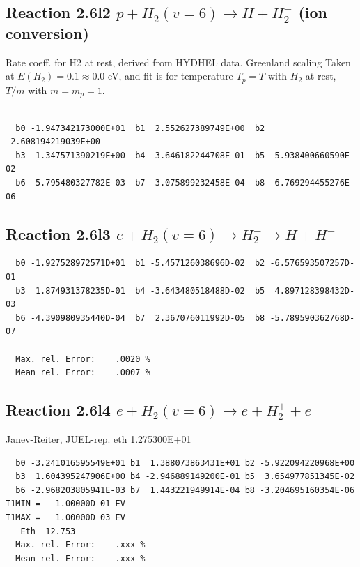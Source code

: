 \documentclass[12pt,dvipdfmx]{article}
\begin{document}
\subsection{
Reaction 2.6l2
$ p + H_2(v=6) \rightarrow H + H_2^+$ (ion conversion)
}
Rate coeff. for H2 at rest, derived from HYDHEL data. Greenland scaling
Taken at $E(H_2) = 0.1 \approx 0.0$ eV,  and fit is for temperature $T_p=T$ with $H_2$ at rest,
$T/m$ with $m=m_p=1$.

\begin{small}\begin{verbatim}

  b0 -1.947342173000E+01  b1  2.552627389749E+00  b2 -2.608194219039E+00
  b3  1.347571390219E+00  b4 -3.646182244708E-01  b5  5.938400660590E-02
  b6 -5.795480327782E-03  b7  3.075899232458E-04  b8 -6.769294455276E-06

\end{verbatim}\end{small}

\newpage

\subsection{
Reaction 2.6l3
 $ e + H_2(v=6) \rightarrow H_2^- \rightarrow H + H^-$
}


\begin{small}\begin{verbatim}
  b0 -1.927528972571D+01  b1 -5.457126038696D-02  b2 -6.576593507257D-01
  b3  1.874931378235D-01  b4 -3.643480518488D-02  b5  4.897128398432D-03
  b6 -4.390980935440D-04  b7  2.367076011992D-05  b8 -5.789590362768D-07

  Max. rel. Error:    .0020 %
  Mean rel. Error:    .0007 %
\end{verbatim}\end{small}

\subsection{
Reaction 2.6l4
 $ e + H_2(v=6) \rightarrow e + H_2^+  + e$
}
Janev-Reiter, JUEL-rep. eth 1.275300E+01

\begin{small}\begin{verbatim}
  b0 -3.241016595549E+01 b1  1.388073863431E+01 b2 -5.922094220968E+00
  b3  1.604395247906E+00 b4 -2.946889149200E-01 b5  3.654977851345E-02
  b6 -2.968203805941E-03 b7  1.443221949914E-04 b8 -3.204695160354E-06
T1MIN =   1.00000D-01 EV
T1MAX =   1.00000D 03 EV
   Eth  12.753
  Max. rel. Error:    .xxx %
  Mean rel. Error:    .xxx %
\end{verbatim}\end{small}
\end{document}
